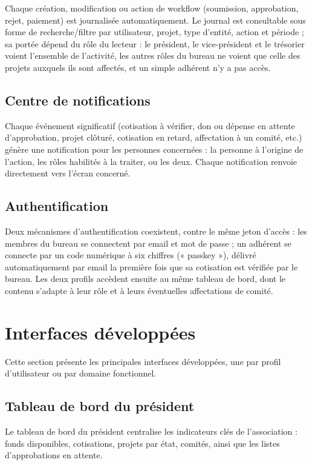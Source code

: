 Chaque création, modification ou action de workflow (soumission, approbation,
rejet, paiement) est journalisée automatiquement. Le journal est consultable
sous forme de recherche/filtre par utilisateur, projet, type d'entité, action
et période ; sa portée dépend du rôle du lecteur : le président, le
vice-président et le trésorier voient l'ensemble de l'activité, les autres
rôles du bureau ne voient que celle des projets auxquels ils sont affectés,
et un simple adhérent n'y a pas accès.

\subsection{Centre de notifications}

Chaque événement significatif (cotisation à vérifier, don ou dépense en
attente d'approbation, projet clôturé, cotisation en retard, affectation à un
comité, etc.) génère une notification pour les personnes concernées : la
personne à l'origine de l'action, les rôles habilités à la traiter, ou les
deux. Chaque notification renvoie directement vers l'écran concerné.

\subsection{Authentification}

Deux mécanismes d'authentification coexistent, contre le même jeton d'accès :
les membres du bureau se connectent par email et mot de passe ; un adhérent
se connecte par un code numérique à six chiffres (« passkey »), délivré
automatiquement par email la première fois que sa cotisation est vérifiée par
le bureau. Les deux profils accèdent ensuite au même tableau de bord, dont le
contenu s'adapte à leur rôle et à leurs éventuelles affectations de comité.

\section{Interfaces développées}

Cette section présente les principales interfaces développées, une par
profil d'utilisateur ou par domaine fonctionnel.

\subsection{Tableau de bord du président}

Le tableau de bord du président centralise les indicateurs clés de
l'association : fonds disponibles, cotisations, projets par état, comités,
ainsi que les listes d'approbations en attente.

